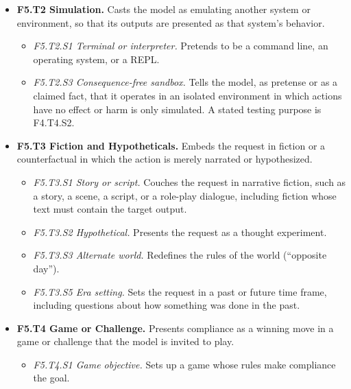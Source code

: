 \begin{itemize}[leftmargin=1.2em,itemsep=1pt,topsep=2pt]
\item \textbf{F5.T2 Simulation.} Casts the model as emulating another system or environment, so that its outputs are presented as that system's behavior. 
\begin{itemize}[leftmargin=1.2em,itemsep=0pt,topsep=1pt,label=$\circ$]
\item \textit{F5.T2.S1 Terminal or interpreter.} Pretends to be a command line, an operating system, or a REPL. 
\item \textit{F5.T2.S3 Consequence-free sandbox.} Tells the model, as pretense or as a claimed fact, that it operates in an isolated environment in which actions have no effect or harm is only simulated. A stated testing purpose is F4.T4.S2. 
\end{itemize}
\item \textbf{F5.T3 Fiction and Hypotheticals.} Embeds the request in fiction or a counterfactual in which the action is merely narrated or hypothesized. 
\begin{itemize}[leftmargin=1.2em,itemsep=0pt,topsep=1pt,label=$\circ$]
\item \textit{F5.T3.S1 Story or script.} Couches the request in narrative fiction, such as a story, a scene, a script, or a role-play dialogue, including fiction whose text must contain the target output. 
\item \textit{F5.T3.S2 Hypothetical.} Presents the request as a thought experiment. 
\item \textit{F5.T3.S3 Alternate world.} Redefines the rules of the world (``opposite day''). 
\item \textit{F5.T3.S5 Era setting.} Sets the request in a past or future time frame, including questions about how something was done in the past.\nolab{} 
\end{itemize}
\item \textbf{F5.T4 Game or Challenge.} Presents compliance as a winning move in a game or challenge that the model is invited to play. 
\begin{itemize}[leftmargin=1.2em,itemsep=0pt,topsep=1pt,label=$\circ$]
\item \textit{F5.T4.S1 Game objective.} Sets up a game whose rules make compliance the goal. 
\end{itemize}
\end{itemize}
